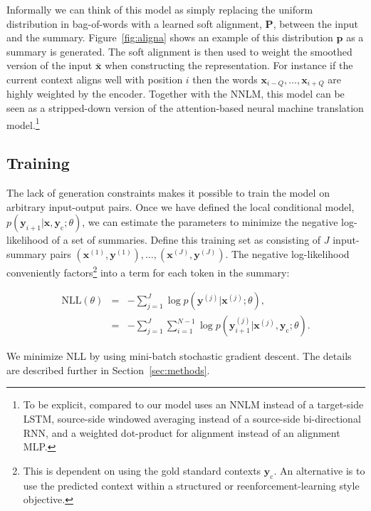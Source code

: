 \documentclass[11pt,a4paper]{article}
\newcommand{\xvec}{\mathbf{x}}
\newcommand{\yvec}{\mathbf{y}}
\newcommand{\context}{\mathbf{y}_{\mathrm{c}}}
\begin{document}
Informally we can think of this model as simply replacing the uniform
distribution in bag-of-words with a learned soft alignment,
$\mathbf{P}$, between the input and the summary.
Figure~\ref{fig:aligna} shows an example of this distribution
$\mathbf{p}$ as a summary is generated. The soft alignment is then used to
weight the smoothed version of the input $\bar{\xvec}$ when
constructing the representation. For instance if the current context
aligns well with position $i$ then the words $\xvec_{i-Q}, \ldots,  \xvec_{i+Q}$
are highly weighted by the encoder.
Together with the NNLM, this model can be seen as a stripped-down version of the
attention-based neural machine translation model.\footnote{To be explicit, compared to  our model uses
  an NNLM instead of a target-side LSTM, source-side windowed
  averaging instead of a source-side bi-directional RNN, and a
  weighted dot-product for alignment instead of an alignment MLP.
}



\subsection{Training}
\label{sec:train}
The lack of generation constraints makes it possible to train the
model on arbitrary input-output pairs.  Once we have defined
the local conditional model, $p(\yvec_{i+1}| \xvec, \context ; \theta)$,  we can estimate the parameters to minimize the
negative log-likelihood of a set of summaries. Define this training
set as consisting of $J$ input-summary pairs $(\xvec^{(1)},
\yvec^{(1)}), \ldots, (\xvec^{(J)}, \yvec^{(J)})$.  The negative
log-likelihood conveniently factors\footnote{This is dependent on using the gold standard contexts $\context$. An alternative is to use the predicted context within a structured or reenforcement-learning style objective.} into a term for each token
in the summary:

\begin{small}
\begin{eqnarray*} 
\mathrm{NLL}(\theta) &=& -\sum_{j=1}^J \log p(\yvec^{(j)}| \xvec^{(j)};\theta), \\
&=& -\sum_{j=1}^J \sum_{i=1}^{N-1} \log p(\yvec_{i+1}^{(j)}| \xvec^{(j)}, \context ; \theta). 
\end{eqnarray*}
\end{small}

\noindent We minimize NLL by using mini-batch stochastic gradient
descent. The details are described further in
Section~\ref{sec:methods}.
 
\end{document}
